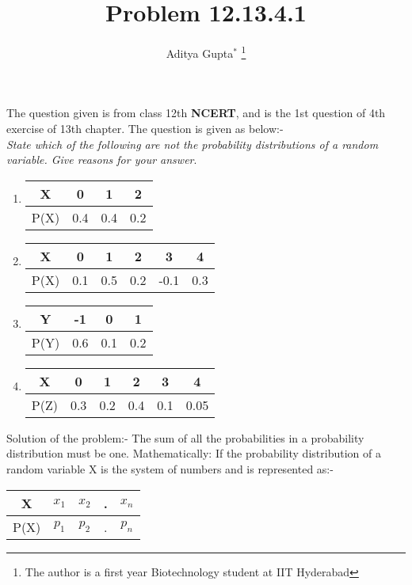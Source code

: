 \documentclass[journal,12pt,twocolumn]{IEEEtran}
\title{
Problem 12.13.4.1
}
\author{Aditya Gupta$^{*}$%
\thanks{The author is a first year Biotechnology student at IIT Hyderabad}}
\begin{document}
\maketitle
\parindent8pt
The question given is from class 12th \textbf{NCERT}, and is the 1st question of 4th exercise of 13th chapter. The question is given as below:-\\
\textit{State which of the following are not the probability distributions of a random
variable. Give reasons for your answer}.

\begin{enumerate}
	\item \begin{tabular}{|c|c|c|c|} 
   \hline
   X & 0 & 1 & 2 \\ 
   \hline
   P(X) & 0.4 & 0.4 & 0.2 \\ 
   \hline
  \end{tabular}

   \item \begin{tabular}{|c|c|c|c|c|c|} 
   \hline
   X & 0 & 1 & 2 & 3 & 4 \\ 
   \hline
   P(X) & 0.1 & 0.5 & 0.2 & -0.1 & 0.3 \\ 
   \hline
  \end{tabular}

	\item \begin{tabular}{|c|c|c|c|} 
   \hline
   Y & -1 & 0 & 1 \\ 
   \hline
   P(Y) & 0.6 & 0.1 & 0.2 \\ 
   \hline
   \end{tabular}

  \item \begin{tabular}{|c|c|c|c|c|c|} 
   \hline
   X & 0 & 1 & 2 & 3 & 4 \\ 
   \hline
   P(Z) & 0.3 & 0.2 & 0.4 & 0.1 & 0.05 \\ 
   \hline
   \end{tabular}
  \end{enumerate}
  
  Solution of the problem:-
  The sum of all the probabilities in a probability distribution must be one. Mathematically: If the probability distribution of a random variable X is the system of numbers and is represented as:-
  
  \begin{tabular}{|c|c|c|c|c|} 
	\hline
	X & $x_1$ & $x_2$ & . & $x_n$ \\ 
	\hline
	P(X) & $p_1$ & $p_2$ & . & $p_n$ \\ 
	\hline
	\end{tabular}
	
\end{document}
